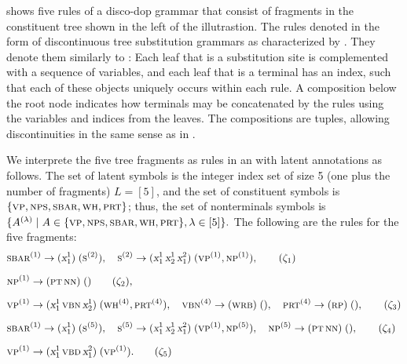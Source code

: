 \documentclass[../../document.tex]{subfiles}
\begin{document}
    \begin{example}\label{ex:dop}\NoEndMark
         shows five rules of a disco-dop grammar that consist of fragments in the constituent tree shown in the left of the illutrastion.
        The rules denoted in the form of discontinuous tree substitution grammars as characterized by \citet{CraSchBod16}.
        They denote them similarly to :
            Each leaf that is a substitution site is complemented with a sequence of variables, and each leaf that is a terminal has an index, such that each of these objects uniquely occurs within each rule.
            A composition below the root node indicates how terminals may be concatenated by the rules using the variables and indices from the leaves.
            The compositions are tuples, allowing discontinuities in the same sense as in .
        
        We interprete the five tree fragments as rules in an  with latent annotations as follows.
        The set of latent symbols is the integer index set of size 5 (one plus the number of fragments) \(L = [5]\), and the set of constituent symbols is \(\{\textsc{vp}, \textsc{np} \textsc{s}, \textsc{sbar}, \textsc{wh}, \textsc{prt}\}\); thus, the set of nonterminals symbols is \(
            \{ A^{(\lambda)} \mid A \in \{\textsc{vp}, \textsc{np} \textsc{s}, \textsc{sbar}, \textsc{wh}, \textsc{prt}\} , \lambda \in [5]\}  \text{.}
        \)
        The following are the  rules for the five fragments:
        \begin{align*}
            &\textsc{sbar}^{(1)} \to (\textsl{x}^1_1)\;(\textsc{s}^{(2)}),\quad
                \textsc{s}^{(2)} \to (\textsl{x}^1_1\,\textsl{x}_2^1\,\textsl{x}_1^2)\;(\textsc{vp}^{(1)}, \textsc{np}^{(1)}), \tag{$\zeta_1$}\\[.2cm]
            &\textsc{np}^{(1)} \to (\textsc{pt}\,\textsc{nn})\;() \tag{$\zeta_2$},\\[.2cm]
            &\textsc{vp}^{(1)} \to (\textsl{x}_1^1\,\textsc{vbn}\,\textsl{x}_2^1)\;(\textsc{wh}^{(4)}, \textsc{prt}^{(4)}),\quad
                 \textsc{vbn}^{(4)} \to (\textsc{wrb})\;(),\quad
                 \textsc{prt}^{(4)} \to (\textsc{rp})\;(), \tag{$\zeta_3$}\\[.2cm]
            &\textsc{sbar}^{(1)} \to (\textsl{x}^1_1)\;(\textsc{s}^{(5)}),\quad
                \textsc{s}^{(5)} \to (\textsl{x}^1_1\,\textsl{x}_2^1\,\textsl{x}_1^2)\;(\textsc{vp}^{(1)}, \textsc{np}^{(5)}),\quad
                \textsc{np}^{(5)} \to (\textsc{pt}\,\textsc{nn})\;(), \tag{$\zeta_4$}\\[.2cm]
            &\textsc{vp}^{(1)} \to (\textsl{x}^1_1\,\textsc{vbd}\,\textsl{x}_1^2)\;(\textsc{vp}^{(1)})\text{.} \tag{$\zeta_5$}
        \end{align*}


\end{example}
\end{document}
